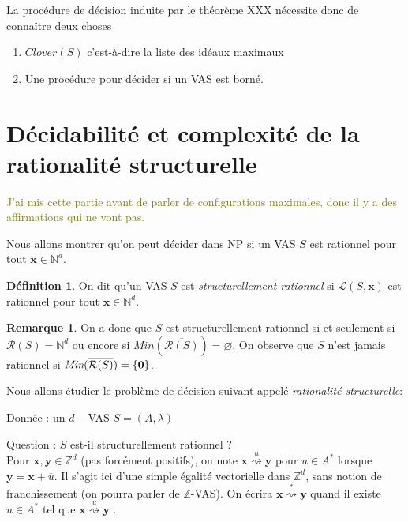 \documentclass[a4paper,final]{article}
\theoremstyle{definition}
\newtheorem{Definition}[Theorem]{Définition}
\newtheorem*{Remark}{Remarque}
\newcommand{\alain}[1]{\textcolor{blue}{#1}}
\newcommand{\lucas}[1]{\textcolor{olive}{#1}}
\newcommand{\os}[1]{\left\{\mathinner{#1}\right\}}
\let\vide\varnothing
\newcommand{\Min}{\textit{Min}}
\newcommand{\N}{\ensuremath{\mathbb{N}}}
\newcommand{\Z}{\ensuremath{\mathbb{Z}}}
\newcommand{\lang}{\ensuremath{\mathcal{L}}}
\newcommand{\clover}{\textit{Clover}}
\newcommand{\transZ}[1]{\ensuremath{\stackrel{#1}{\rightsquigarrow}}}
\newcommand{\vect}[1]{\ensuremath{\mathbf{#1}}}
\newcommand{\valeur}[1]{\ensuremath{\overline{#1}}}
\newcommand{\inirat}{\mathcal{R}}
\begin{document}
La procédure de décision induite par le théorème XXX nécessite donc de connaître deux choses %
\begin{enumerate}
    \item $\clover(S)$ c'est-à-dire la liste des idéaux maximaux
    \item Une procédure pour décider si un VAS est borné.
\end{enumerate}

\section{Décidabilité et complexité de la rationalité structurelle}

\lucas{J'ai mis cette partie avant de parler de configurations maximales, donc il y a des affirmations qui ne vont pas.}

Nous allons montrer qu'on peut décider dans NP si un VAS $S$ est rationnel pour tout $\vect{x} \in \N^d$. 

\begin{Definition}
On dit qu'un VAS $S$ est \emph{structurellement rationnel} si $\lang(S,\vect{x})$ est rationnel pour tout $\vect{x} \in \N^d$.
\end{Definition}

\begin{Remark}
On a donc que $S$ est structurellement rationnel si et seulement si $\inirat(S) = \N^d$ ou encore si
 $\Min(\overline{\inirat(S)})=\vide$. On observe que $S$ n'est jamais rationnel si $\Min(\overline{\inirat(S)})=\os{\vect{0}}$.  
\end{Remark}

Nous allons étudier le problème de décision suivant appelé \emph{rationalité structurelle}:

Donnée : un $d-$VAS $S=(A,\lambda)$

Question : $S$ est-il structurellement rationnel ? \\

Pour $\vect{x},\vect{y}\in\Z^d$ (pas forcément positifs), on note $\vect{x} \transZ{u} \vect{y}$ pour $u\in A^*$ lorsque $\vect{y} = \vect{x} + \valeur{u}$.
Il s'agit ici d'une simple égalité vectorielle dans $\Z^d$, sans notion de franchissement (on pourra parler de $\Z$-VAS).
On écrira $\vect{x} \transZ{*} \vect{y}$ quand il existe $u\in A^*$ tel que $\vect{x} \transZ{u} \vect{y}$ .
\end{document}
